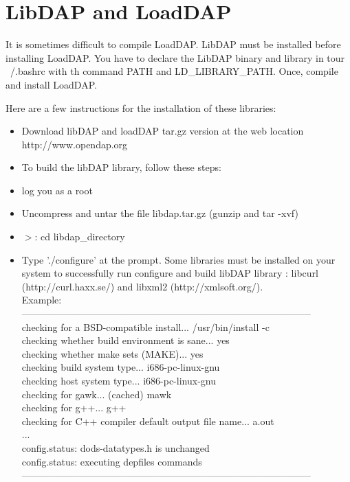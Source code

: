 \section{LibDAP and  LoadDAP}
It is sometimes difficult to compile LoadDAP.  LibDAP must be installed before
installing LoadDAP. You have to declare the LibDAP binary and library in tour
~/.bashrc with th command PATH and LD\_LIBRARY\_PATH. Once, compile and install
LoadDAP.

Here are a few instructions for the installation of these libraries:\\
\begin{itemize}
\item Download libDAP and loadDAP tar.gz version at the web location
http://www.opendap.org
\item To build the libDAP library, follow these steps:\\
\item log you as a root
\item Uncompress and untar the file libdap.tar.gz (gunzip and tar -xvf)
\item $>$: cd libdap\_directory
\item Type './configure' at the prompt. Some libraries must be installed 
on your system to successfully run configure and build libDAP library : libcurl 
(http://curl.haxx.se/) and libxml2 (http://xmlsoft.org/).\\
Example:\\
------------------------------------------------------------------------------------------\\
checking for a BSD-compatible install... /usr/bin/install -c\\
checking whether build environment is sane... yes\\
checking whether make sets (MAKE)... yes\\
checking build system type... i686-pc-linux-gnu\\
checking host system type... i686-pc-linux-gnu\\
checking for gawk... (cached) mawk\\
checking for g++... g++\\
checking for C++ compiler default output file name... a.out\\
...\\
config.status: dods-datatypes.h is unchanged\\
config.status: executing depfiles commands\\
------------------------------------------------------------------------------------------\\

\end{itemize}
